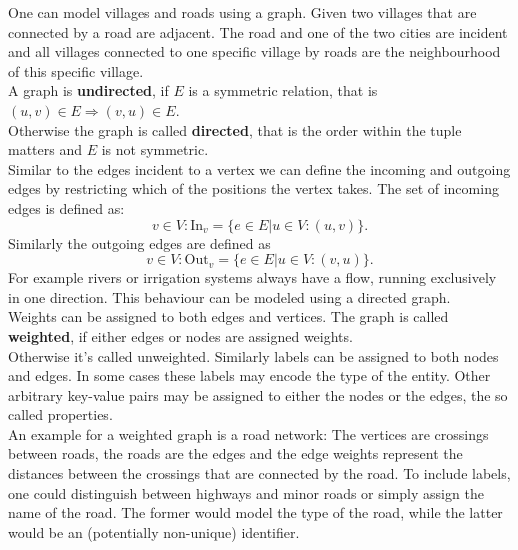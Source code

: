             One can model villages and roads using a graph. 
            Given two villages that are connected by a road are adjacent. 
            The road and one of the two cities are incident and all villages connected to one specific village by roads are the neighbourhood of this specific village. \\
            
            A graph is \textbf{undirected}, if $E$ is a symmetric relation, that is $(u, v) \in E \Rightarrow (v, u) \in E$. \\
            Otherwise the graph is called \textbf{directed}, that is the order within the tuple matters and $E$ is not symmetric. \\
            
            Similar to the edges incident to a vertex we can define the incoming and outgoing edges by restricting which of the positions the vertex takes. 
            The set of incoming edges is defined as:
            \[v \in V: \text{In}_v = \{e \in E |u \in V: (u, v) \}.\]
            Similarly the outgoing edges are defined as \[v \in V: \text{Out}_v = \{e \in E |u \in V: (v, u) \}.\]
            For example rivers or irrigation systems always have a flow, running exclusively in one direction. 
            This behaviour can be modeled using a directed graph.\\
            
            Weights can be assigned to both edges and vertices. The graph is called \textbf{weighted}, if either edges or nodes are assigned weights. \\
            Otherwise it's called unweighted.
            Similarly labels can be assigned to both nodes and edges. 
            In some cases these labels may encode the type of the entity.
            Other arbitrary key-value pairs may be assigned to either the nodes or the edges, the so called properties. \\
            
            An example for a weighted graph is a road network: 
            The vertices are crossings between roads, the roads are the edges and the edge weights represent the distances between the crossings that are connected by the road.
            To include labels, one could distinguish between highways and minor roads or simply assign the name of the road. 
            The former would model the type of the road, while the latter would be an (potentially non-unique) identifier.\\
            
